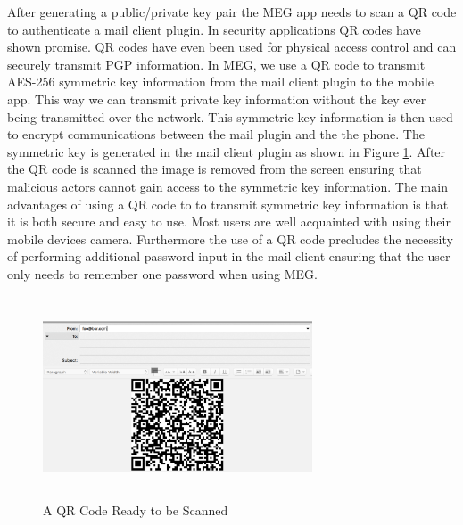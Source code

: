 \documentclass[11pt]{article}
\begin{document}
\par After generating a public/private key pair the MEG app needs to scan a QR code to authenticate a mail client plugin. In security applications QR codes have shown promise. QR codes have even been used for physical access control \cite{qrcode-authentication} and can securely transmit PGP information\cite{qrcode-key-distribution}. In MEG, we use a QR code to transmit AES-256 symmetric key information from the mail client plugin to the mobile app. This way we can transmit private key information without the key ever being transmitted over the network. This symmetric key information is then used to encrypt communications between the mail plugin and the the phone. The symmetric key is generated in the mail client plugin as shown in Figure \ref{fig:qr}. After the QR code is scanned the image is removed from the screen ensuring that malicious actors cannot gain access to the symmetric key information. The main advantages of using a QR code to to transmit symmetric key information is that it is both secure and easy to use. Most users are well acquainted with using their mobile devices camera. Furthermore the use of a QR code precludes the necessity of performing additional password input in the mail client ensuring that the user only needs to remember one password when using MEG.

\begin{figure}
    \centering
    \includegraphics[width=8cm,height=6cm]{qr-code-thunderbird.png}
    \caption{A QR Code Ready to be Scanned}
    \label{fig:qr}
\end{figure}
\end{document}
